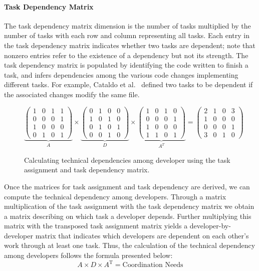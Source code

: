 \paragraph{Task Dependency Matrix}
The task dependency matrix dimension is the number of tasks multiplied by the number of tasks with each row and column representing all tasks.
Each entry in the task dependency matrix indicates whether two tasks are dependent; note that nonzero entries refer to the existence of a dependency but not its strength.
The task dependency matrix is populated by identifying the code written to finish a task, and infers dependencies among the various code changes implementing different tasks.
For example, Cataldo et al.~\cite{cataldo:cscw:2006} defined two tasks to be dependent if the associated changes modify the same file. 

\begin{figure}[t!]
\centering
\[
\underbrace{
\left(
\begin{matrix}
1 & 0 & 1 & 1\\
0 & 0 & 0 & 1\\
1 & 0 & 0 & 0\\
0 & 1 & 0 & 1
\end{matrix}
\right)
}_{A}
\times
\underbrace{
\left(
\begin{matrix}
0 & 1 & 0 & 0\\
1 & 0 & 1 & 0\\
0 & 1 & 0 & 1\\
0 & 0 & 1 & 0
\end{matrix}
\right)
}_{D}
\times
\underbrace{
\left(
\begin{matrix}
1 & 0 & 1 & 0\\
0 & 0 & 0 & 1\\
1 & 0 & 0 & 0\\
1 & 1 & 0 & 1
\end{matrix}
\right)
}_{A^T}
=
\left(
\begin{matrix}
2 & 1 & 0 & 3\\
1 & 0 & 0 & 0\\
0 & 0 & 0 & 1\\
3 & 0 & 1 & 0
\end{matrix}
\right)
\]
\caption{Calculating technical dependencies among developer using the task assignment and task dependency matrix.}
\label{chap:3:fig:example:stc:cataldo}
\end{figure}
Once the matrices for task assignment and task dependency are derived, we can compute the technical dependency among developers.
Through a matrix multiplication of the task assignment with the task dependency matrix we obtain a matrix describing on which task a developer depends.
Further multiplying this matrix with the transposed task assignment matrix yields a developer-by-developer matrix that indicates which developers are dependent on each other's work through at least one task. 
%
Thus, the calculation of the technical dependency among developers follows the formula presented below:
\begin{equation}
\label{eq:stc:cataldo}
A \times D \times A^{\text{T}} = \text{Coordination Needs}
\end{equation}

